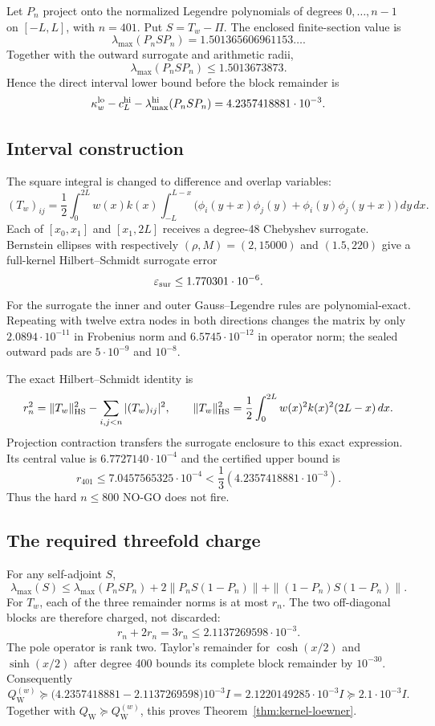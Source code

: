 \documentclass[11pt]{article}
\newcommand{\QW}{Q_{\mathrm W}}
\begin{document}
Let $P_n$ project onto the normalized Legendre polynomials of degrees
$0,\ldots,n-1$ on $[-L,L]$, with $n=401$.  Put
$S=T_w-\Pi$.  The enclosed finite-section value is
\[
 \lambda_{\max}(P_nSP_n)
 =1.501365606961153\ldots .
\]
Together with the outward surrogate and arithmetic radii,
\[
 \lambda_{\max}(P_nSP_n)\le1.5013673873 .
\]
Hence the direct interval lower bound before the block remainder is
\[
 \kappa_w^{\rm lo}-c_L^{\rm hi}
 -\lambda_{\max}^{\rm hi}(P_nSP_n)
 =4.2357418881\cdot10^{-3}.
\]

\subsection{Interval construction}

The square integral is changed to difference and overlap variables:
\[
 (T_w)_{ij}=\frac12\int_0^{2L}w(x)k(x)
 \int_{-L}^{L-x}
 \bigl(\phi_i(y+x)\phi_j(y)+\phi_i(y)\phi_j(y+x)\bigr)\,dy\,dx .
\]
Each of $[x_0,x_1]$ and $[x_1,2L]$ receives a degree-48 Chebyshev
surrogate.  Bernstein ellipses with respectively
$(\rho,M)=(2,15000)$ and $(1.5,220)$ give a full-kernel
Hilbert--Schmidt surrogate error
\[
 \varepsilon_{\rm sur}\le1.770301\cdot10^{-6}.
\]
For the surrogate the inner and outer Gauss--Legendre rules are
polynomial-exact.  Repeating with twelve extra nodes in both
directions changes the matrix by only
$2.0894\cdot10^{-11}$ in Frobenius norm and
$6.5745\cdot10^{-12}$ in operator norm; the sealed outward pads are
$5\cdot10^{-9}$ and $10^{-8}$.

The exact Hilbert--Schmidt identity is
\[
 r_n^2=
 \|T_w\|_{\rm HS}^2-\sum_{i,j<n}|(T_w)_{ij}|^2,\qquad
 \|T_w\|_{\rm HS}^2
 =\frac12\int_0^{2L}w(x)^2k(x)^2(2L-x)\,dx .
\]
Projection contraction transfers the surrogate enclosure to this
exact expression.  Its central value is
$6.7727140\cdot10^{-4}$ and the certified upper bound is
\[
 r_{401}\le7.0457565325\cdot10^{-4}
 <\frac13(4.2357418881\cdot10^{-3}).
\]
Thus the hard $n\le800$ NO-GO does not fire.

\subsection{The required threefold charge}

For any self-adjoint $S$,
\[
 \lambda_{\max}(S)\le\lambda_{\max}(P_nSP_n)
 +2\|P_nS(1-P_n)\|+\|(1-P_n)S(1-P_n)\|.
\]
For $T_w$, each of the three remainder norms is at most $r_n$.
The two off-diagonal blocks are therefore charged, not discarded:
\[
 r_n+2r_n=3r_n
 \le2.1137269598\cdot10^{-3}.
\]
The pole operator is rank two.  Taylor's remainder for
$\cosh(x/2)$ and $\sinh(x/2)$ after degree 400 bounds its complete
block remainder by $10^{-30}$.
Consequently
\[
 \QW^{(w)}
 \succeq
 \bigl(4.2357418881-2.1137269598\bigr)10^{-3}I
 =2.1220149285\cdot10^{-3}I
 \succeq2.1\cdot10^{-3}I .
\]
Together with $\QW\succeq\QW^{(w)}$, this proves
Theorem~\ref{thm:kernel-loewner}.
\end{document}
